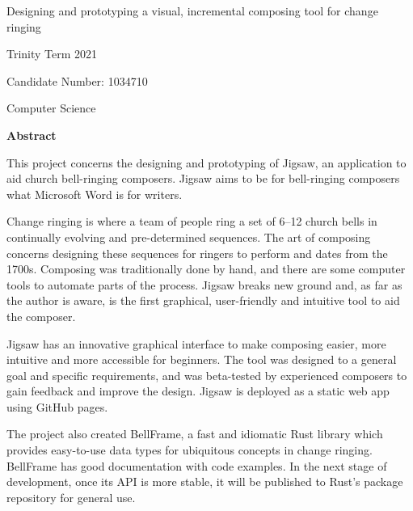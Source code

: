 \documentclass[12pt]{article}
\begin{document}
\begin{titlepage}
    \begin{center}
        \vspace*{2in}
        \Huge
        Designing and prototyping a visual, incremental composing tool for change ringing
        \Large

        Trinity Term 2021

        Candidate Number: 1034710

        Computer Science
    \end{center}
\end{titlepage}



\pagebreak

\begin{center}
    \large
    \textbf{Abstract}
\end{center}

This project concerns the designing and prototyping of Jigsaw, an application to aid church
bell-ringing composers.  Jigsaw aims to be for bell-ringing composers what Microsoft Word is for
writers.

Change ringing is where a team of people ring a set of 6--12 church bells in continually evolving and
pre-determined sequences. The art of composing concerns designing these sequences for ringers to
perform and dates from the 1700s.  Composing was traditionally done by hand, and there are some
computer tools to automate parts of the process. Jigsaw breaks new ground and, as far as the author
is aware, is the first graphical, user-friendly and intuitive tool to aid the composer.

Jigsaw has an innovative graphical interface to make composing easier, more intuitive and more
accessible for beginners. The tool was designed to a general goal and specific requirements, and was
beta-tested by experienced composers to gain feedback and improve the design.  Jigsaw is deployed as
a static web app using GitHub pages.

The project also created BellFrame, a fast and idiomatic Rust library which provides easy-to-use
data types for ubiquitous concepts in change ringing. BellFrame has good documentation with code
examples. In the next stage of development, once its API is more stable, it will be published to
Rust's package repository for general use.



\pagebreak

\tableofcontents
\end{document}
